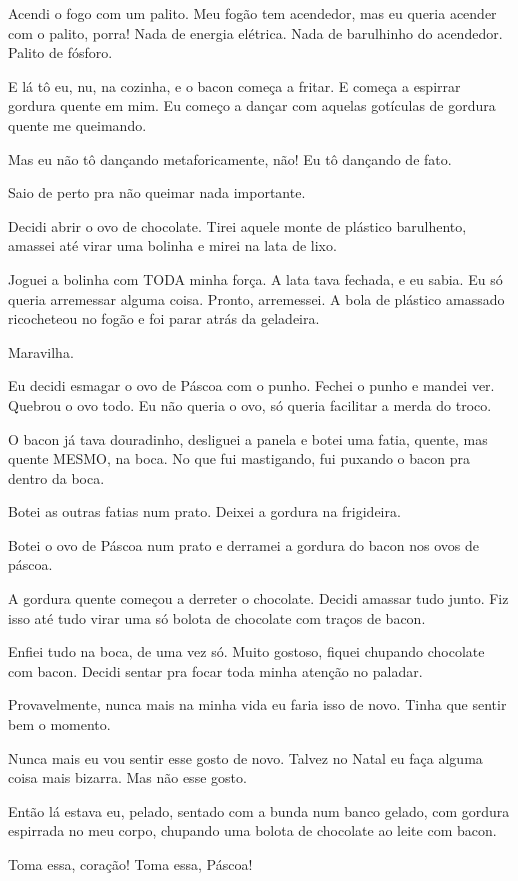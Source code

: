 Acendi o fogo com um palito. Meu fogão tem acendedor, mas eu queria acender com o palito, porra! Nada de energia elétrica. Nada de barulhinho do acendedor. Palito de fósforo.

E lá tô eu, nu, na cozinha, e o bacon começa a fritar. E começa a espirrar gordura quente em mim. Eu começo a dançar com aquelas gotículas de gordura quente me queimando.

Mas eu não tô dançando metaforicamente, não! Eu tô dançando de fato.

Saio de perto pra não queimar nada importante.

Decidi abrir o ovo de chocolate. Tirei aquele monte de plástico barulhento, amassei até virar uma bolinha e mirei na lata de lixo.

Joguei a bolinha com TODA minha força. A lata tava fechada, e eu sabia. Eu só queria arremessar alguma coisa. Pronto, arremessei. A bola de plástico amassado ricocheteou no fogão e foi parar atrás da geladeira.

Maravilha.

Eu decidi esmagar o ovo de Páscoa com o punho. Fechei o punho e mandei ver. Quebrou o ovo todo. Eu não queria o ovo, só queria facilitar a merda do troco.

O bacon já tava douradinho, desliguei a panela e botei uma fatia, quente, mas quente MESMO, na boca. No que fui mastigando, fui puxando o bacon pra dentro da boca.

Botei as outras fatias num prato. Deixei a gordura na frigideira.

Botei o ovo de Páscoa num prato e derramei a gordura do bacon nos ovos de páscoa.

A gordura quente começou a derreter o chocolate. Decidi amassar tudo junto. Fiz isso até tudo virar uma só bolota de chocolate com traços de bacon.

Enfiei tudo na boca, de uma vez só. Muito gostoso, fiquei chupando chocolate com bacon. Decidi sentar pra focar toda minha atenção no paladar.

Provavelmente, nunca mais na minha vida eu faria isso de novo. Tinha que sentir bem o momento.

Nunca mais eu vou sentir esse gosto de novo. Talvez no Natal eu faça alguma coisa mais bizarra. Mas não esse gosto.

Então lá estava eu, pelado, sentado com a bunda num banco gelado, com gordura espirrada no meu corpo, chupando uma bolota de chocolate ao leite com bacon.

Toma essa, coração! Toma essa, Páscoa!

